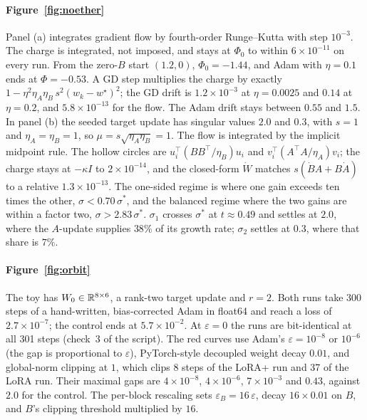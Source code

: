 \paragraph{Figure~\ref{fig:noether}} Panel (a) integrates gradient flow by fourth-order Runge--Kutta with step $10^{-3}$.
The charge is integrated, not imposed, and stays at $\Phi_0$ to within $6\times10^{-11}$ on every run. From the zero-$B$
start $(1.2,0)$, $\Phi_0=-1.44$, and Adam with $\eta=0.1$ ends at $\Phi=-0.53$. A GD step multiplies the charge by exactly
$1-\eta^2\eta_A\eta_B\,s^2(w_k-w^\star)^2$; the GD drift is $1.2\times10^{-3}$ at $\eta=0.0025$ and $0.14$ at $\eta=0.2$,
and $5.8\times10^{-13}$ for the flow. The Adam drift stays between $0.55$ and $1.5$. In panel (b) the seeded target update
has singular values $2.0$ and $0.3$, with $s=1$ and $\eta_A=\eta_B=1$, so $\mu=s\sqrt{\eta_A\eta_B}=1$. The flow is
integrated by the implicit midpoint rule. The hollow circles are $u_i^\top(BB^\top/\eta_B)u_i$ and
$v_i^\top(A^\top A/\eta_A)v_i$; the charge stays at $-\kappa I$ to $2\times10^{-14}$, and the closed-form $\dot W$ matches
$s(\dot BA+B\dot A)$ to a relative $1.3\times10^{-13}$. The one-sided regime is where one gain exceeds ten times the
other, $\sigma<0.70\,\sigma^*$, and the balanced regime where the two gains are within a factor two,
$\sigma>2.83\,\sigma^*$. $\sigma_1$ crosses $\sigma^*$ at $t\approx0.49$ and settles at $2.0$, where the $A$-update
supplies $38\%$ of its growth rate; $\sigma_2$ settles at $0.3$, where that share is $7\%$.

\paragraph{Figure~\ref{fig:orbit}} The toy has $W_0\in\mathbb{R}^{8\times6}$, a rank-two target update and $r=2$. Both runs take
300 steps of a hand-written, bias-corrected Adam in float64 and reach a loss of $2.7\times10^{-7}$; the control ends at
$5.7\times10^{-2}$. At $\varepsilon=0$ the runs are bit-identical at all 301 steps (check~3 of the script). The red curves
use Adam's $\varepsilon=10^{-8}$ or $10^{-6}$ (the gap is proportional to $\varepsilon$), PyTorch-style decoupled weight
decay $0.01$, and global-norm clipping at $1$, which clips 8 steps of the LoRA+ run and 37 of the LoRA run. Their maximal
gaps are $4\times10^{-8}$, $4\times10^{-6}$, $7\times10^{-3}$ and $0.43$, against $2.0$ for the control. The per-block
rescaling sets $\varepsilon_B=16\,\varepsilon$, decay $16\times0.01$ on $B$, and $B$'s clipping threshold multiplied by
$16$.

